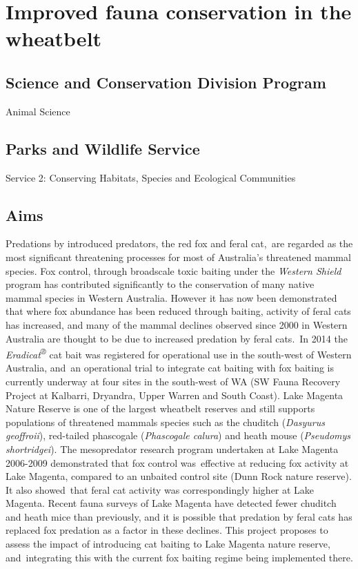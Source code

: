\documentclass[version=last,
    paper=a4, %
    10pt, %
    usenames,
    dvipsnames,
    oneside, %
    headings=openany, %
    DIV=15 %
]{scrbook}
\begin{document}
\section*{Improved fauna conservation in the wheatbelt
}



\subsection*{Science and Conservation Division Program}

Animal Science




\subsection*{Parks and Wildlife Service}

Service 2: Conserving Habitats, Species and Ecological Communities




\subsection*{Aims}

Predations by introduced predators, the red fox and feral cat,~are
regarded as the most significant threatening processes for most of
Australia's threatened mammal species. Fox control, through broadscale
toxic baiting under the \emph{Western Shield} program has contributed
significantly to the conservation of many native mammal species in
Western Australia. However it has now been demonstrated that where fox
abundance has been reduced through baiting, activity of feral cats has
increased, and many of the mammal declines observed since 2000 in
Western Australia are thought to be due to increased predation by feral
cats.~In 2014 the \emph{Eradicat\textsuperscript{®}} cat bait was
registered for operational use in the south-west of Western Australia,
and~an operational trial to integrate cat baiting with fox baiting is
currently underway at four sites in the south-west of WA (SW Fauna
Recovery Project at Kalbarri, Dryandra, Upper Warren and South Coast).
Lake Magenta Nature Reserve is one of the largest wheatbelt reserves and
still supports populations of threatened mammals species such as the
chuditch (\emph{Dasyurus geoffroii}), red-tailed phascogale
(\emph{Phascogale calura}) and heath mouse (\emph{Pseudomys
shortridgei}). The mesopredator research program undertaken at Lake
Magenta 2006-2009 demonstrated that fox control was~effective at
reducing fox activity at Lake Magenta, compared to an unbaited control
site (Dunn Rock nature reserve). It also showed~that feral cat activity
was correspondingly higher at Lake Magenta. Recent fauna surveys of Lake
Magenta have detected fewer chuditch and heath mice than previously, and
it is possible that predation by feral cats has replaced fox predation
as a factor in these declines. This project proposes to assess the
impact of introducing cat baiting to Lake Magenta nature reserve,
and~integrating this with the current fox baiting regime being
implemented there.
\end{document}
